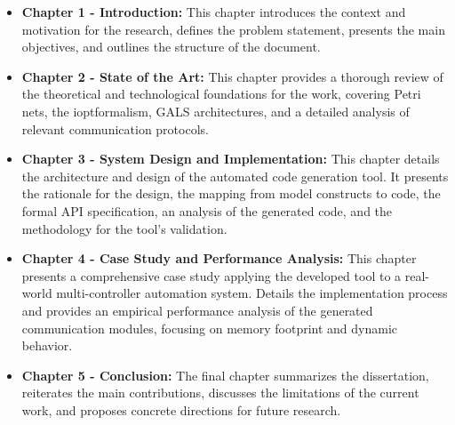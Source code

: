\begin{itemize}
    \item \textbf{Chapter 1 - Introduction:} This chapter introduces the context and motivation for the research, defines the problem statement, presents the main objectives, and outlines the structure of the document.

    \item \textbf{Chapter 2 - State of the Art:} This chapter provides a thorough review of the theoretical and technological foundations for the work, covering Petri nets, the \gls{iopt}formalism, GALS architectures, and a detailed analysis of relevant communication protocols.

    \item \textbf{Chapter 3 - System Design and Implementation:} This chapter details the architecture and design of the automated code generation tool. It presents the rationale for the design, the mapping from model constructs to code, the formal API specification, an analysis of the generated code, and the methodology for the tool's validation.

    \item \textbf{Chapter 4 - Case Study and Performance Analysis:} This chapter presents a comprehensive case study applying the developed tool to a real-world multi-controller automation system. Details the implementation process and provides an empirical performance analysis of the generated communication modules, focusing on memory footprint and dynamic behavior.

    \item \textbf{Chapter 5 - Conclusion:} The final chapter summarizes the dissertation, reiterates the main contributions, discusses the limitations of the current work, and proposes concrete directions for future research.
\end{itemize}


